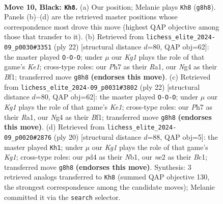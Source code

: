 \documentclass[11pt]{article}
\begin{document}
\begin{figure}[p]
\label{fig:thought-m17}
\end{figure}

\clearpage

\begin{figure}[p]\centering
\begin{subfigure}{0.46\textwidth}\centering
\resizebox{\linewidth}{!}{%
\newchessgame
\chessboard[
  setfen={rnbqr1k1/pp2bppp/2p5/3p4/3P1Bn1/1PN1P3/P1Q1NPPP/R3KB1R b KQ - 0 10},
  showmover=false,
  pgfstyle=straightmove, color=movearrow, markmove={g8-h8}
]}
\caption{}
\end{subfigure}\hfill
\begin{subfigure}{0.46\textwidth}\centering
\resizebox{\linewidth}{!}{%
\newchessgame
\chessboard[
  setfen={r1b1kb1r/2qn1pp1/p2ppn1p/1p6/3NPP2/P1N2Q2/1PP2BPP/R3KB1R w KQkq - 0 12},
  showmover=false,
  pgfstyle=straightmove, color=movearrow, markmove={e1-c1}
]}
\caption{}
\end{subfigure}
\\[4pt]
\begin{subfigure}{0.46\textwidth}\centering
\resizebox{\linewidth}{!}{%
\newchessgame
\chessboard[
  setfen={r1b1kb1r/2qn1pp1/p2ppn1p/1p6/3NPP2/P1N2Q2/1PP2BPP/R3KB1R w KQkq - 0 12},
  showmover=false,
  pgfstyle=straightmove, color=movearrow, markmove={e1-c1}
]}
\caption{}
\end{subfigure}\hfill
\begin{subfigure}{0.46\textwidth}\centering
\resizebox{\linewidth}{!}{%
\newchessgame
\chessboard[
  setfen={r1b1k2r/1pqpnp1p/p1n1p3/2p2P2/3b4/2NP2P1/PPP3BP/RNBQ1RK1 w kq - 1 11},
  showmover=false,
  pgfstyle=straightmove, color=movearrow, markmove={g1-h1}
]}
\caption{}
\end{subfigure}
\caption{\textbf{Move 10, Black: \texttt{Kh8}.} (a) Our position; Melanie plays \texttt{Kh8} (\texttt{g8h8}). Panels (b)--(d) are the retrieved master positions whose correspondence most drove this move (highest QAP objective among those that transfer to it). (b) Retrieved from \texttt{lichess\_elite\_2024-09\_p0030\#3351} (ply 22) [structural distance $d$=80, QAP obj=62]: the master played \texttt{O-O-O}; under $\mu$ our \emph{Kg1} plays the role of that game's \emph{Ke1}; cross-type roles: our \emph{P}h7 as their \emph{R}a1, our \emph{N}g4 as their \emph{B}f1; transferred move \texttt{g8h8} \textbf{(endorses this move)}. (c) Retrieved from \texttt{lichess\_elite\_2024-09\_p0031\#3802} (ply 22) [structural distance $d$=80, QAP obj=62]: the master played \texttt{O-O-O}; under $\mu$ our \emph{Kg1} plays the role of that game's \emph{Ke1}; cross-type roles: our \emph{P}h7 as their \emph{R}a1, our \emph{N}g4 as their \emph{B}f1; transferred move \texttt{g8h8} \textbf{(endorses this move)}. (d) Retrieved from \texttt{lichess\_elite\_2024-09\_p0020\#2876} (ply 20) [structural distance $d$=88, QAP obj=5]: the master played \texttt{Kh1}; under $\mu$ our \emph{Kg1} plays the role of that game's \emph{Kg1}; cross-type roles: our \emph{p}d4 as their \emph{N}b1, our \emph{n}e2 as their \emph{B}c1; transferred move \texttt{g8h8} \textbf{(endorses this move)}. Synthesis: 3 retrieved analogs transferred to \texttt{Kh8} (summed QAP objective 130, the strongest correspondence among the candidate moves); Melanie committed it via the \texttt{search} selector.}

\end{figure}
\end{document}
